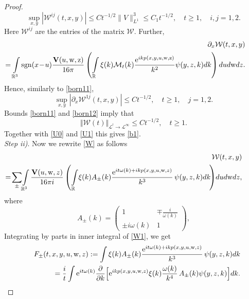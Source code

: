 \documentclass[reqno]{amsart}
\newcommand{\R}{{\mathbb R}}
\newcommand{\cL}{{\mathcal L}}
\newcommand{\ds}{\displaystyle}
\newcommand{\E}{\mathrm{e}}
\numberwithin{equation}{section}
\begin{document}
\begin{proof}
\begin{equation}\label{born11}
\sup\limits_{x,y}|{\mathcal W}^{ij}(t,x,y)|\le C t^{-1/2}\|V\|_{L^1}^3\le C_1t^{-1/2},\quad t\ge 1,\quad i,j=1,2.
\end{equation}
Here ${\mathcal W}^{ij}$ are the entries of the matrix ${\mathcal W}$. Further,
\begin{eqnarray}\nonumber
\!\!\!\!\!\!\!\!\!\!\!\! &&\!\!\!\!\!\!\!\!\partial_x{\mathcal W}(t,x,y)\\
\nonumber
\!\!\!\!\!\!\!\!\!\!\!\!&&\!\!\!\!\!\!\!\!=\int\limits_{\R^3} {\rm sgn} (x\!-\!u)\frac{{\mathbf V}(u,\rm w,z)}{16 \pi}\left(\int\limits_{\R} \xi(k)
{\mathcal M}_t(k)
\frac{\E^{ikp(x,y,u,\rm w,z)}}{k^2}\psi(y,z,k)dk\right) dud{\rm w} dz.
\end{eqnarray}
Hence, similarly to \eqref{born11},
\begin{equation}\label{born12}
\sup\limits_{x,y}|\partial_x{\mathcal W}^{1j}(t,x,y)|\le C t^{-1/2},\quad t\ge 1,\quad j=1,2.
\end{equation}
Bounds \eqref{born11} and \eqref{born12} imply that
\[%
\Vert {\mathcal W}(t)\Vert_{\cL^{!}\to \cL^\infty}\le C t^{-1/2}, \quad t\ge 1.
\]%
Together with  \eqref{U0} and \eqref{U1} this gives \eqref{b1}.
\smallskip\\
{\it Step ii)}.
Now we rewrite \eqref{W} as follows
\begin{eqnarray}\nonumber
\!\!\!\!\!\!\!\!\!\!&&\!\!\!\!\!\!\!\!\!\!\!\!\!{\mathcal W}(t,x,y)\\
\label{W1}
\!\!\!\!\!\!\!\!\!\!&&\!\!\!\!\!\!\!\!\!\!\!\!\!
= \!\sum_{\pm} \!\int\limits_{\R^3} \frac{{\mathbf V}(u,{\rm w},z)}{16 \pi i}\left(\int\limits_\R\! \xi(k)A_{\pm}(k)
\frac{\E^{it\omega(k)+ikp(x,y,u,{\rm w},z)}}{k^3}\, \psi(y,z,k)dk\!\right)\! dud{\rm w} dz,
\end{eqnarray}
where
\[
A_{\pm}(k)=\begin{pmatrix}
1  & \mp\ds\frac{i}{\omega(k)}\\
  \pm i\omega(k)& 1
\end{pmatrix},
\]
Integrating by parts in inner integral of \eqref{W1}, we get
\begin{eqnarray}\nonumber
&&F_{\pm}(t,x,y,u,{\rm w},z):=\int \xi(k)A_{\pm}(k)\frac{\E^{it\omega(k)+ikp(x,y,u,{\rm w},z)}}{k^3}\, \psi(y,z,k)dk\\
\nonumber
&&=\frac{i}{t}\int \E^{it\omega(k)}\frac{\partial}{\partial k}
\Big[\E^{ikp(x,y,u,{\rm w},z)}\xi(k)\frac{\omega(k)}{k^4}\,A_{\pm}(k) \psi(y,z,k)\Big]dk.

\end{eqnarray}
\end{proof}
\end{document}
